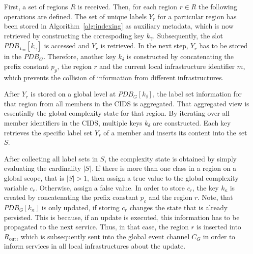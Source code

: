 First, a set of regions $R$ is received. Then, for each region $r \in R$ the following operations are defined. The set of unique labels $Y_r$ for a particular region has been stored in Algorithm~\ref{alg:indexing} as auxiliary metadata, which is now retrieved by constructing the correspoding key $k_\gamma$. Subsequently, the slot $PDB_{L_m}[k_\gamma]$ is accessed and $Y_r$ is retrieved. In the next step, $Y_r$ has to be stored in the $PDB_G$. Therefore, another key $k_\delta$ is constructed by concatenating the prefix constant $p_y$, the region $r$ and the current local infrastructure identifier $m$, which prevents the collision of information from different infrastructures.

After $Y_r$ is stored on a global level at $PDB_G[k_\delta]$, the label set information for that region from all members in the CIDS is aggregated. That aggregated view is essentially the global complexity state for that region. By iterating over all member identifiers in the CIDS, multiple keys $k_\delta$ are constructed. Each key retrieves the specific label set $Y_r$ of a member and inserts its content into the set $S$. 

After collecting all label sets in $S$, the complexity state is obtained by simply evaluating the cardinality $|S|$. If there is more than one class in a region on a global scope, that is $|S| > 1$, then assign a true value to the global complexity variable $c_r$. Otherwise, assign a false value. In order to store $c_r$, the key $k_\kappa$ is created by concatenating the prefix constant $p_c$ and the region $r$. Note, that $PDB_G[k_\kappa]$ is only updated, if storing $c_r$ changes the state that is already persisted. This is because, if an update is executed, this information has to be propagated to the next service. Thus, in that case, the region $r$ is inserted into $R_{\text{out}}$, which is subsequently sent into the global event channel $C_G$ in order to inform services in all local infrastructures about the update.